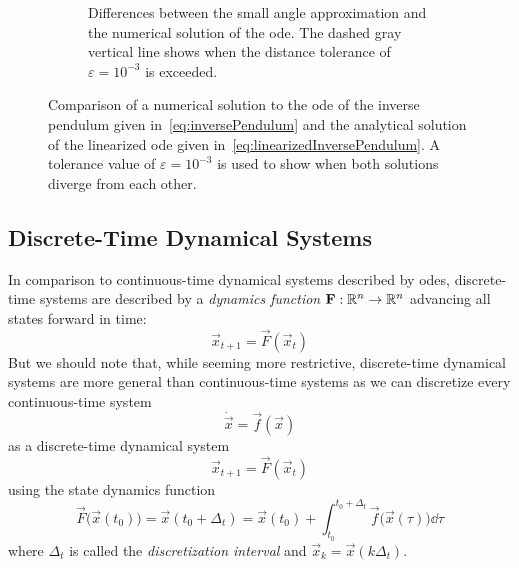 \begin{figure}
\begin{subfigure}[t]{0.5\linewidth}
				\caption{Differences between the small angle approximation and the numerical solution of the \ac{ode}. The dashed gray vertical line shows when the distance tolerance of \( \varepsilon = 10^{-3} \) is exceeded.}
			\end{subfigure}
			\caption{Comparison of a numerical solution to the \ac{ode} of the inverse pendulum given in~\eqref{eq:inversePendulum} and the analytical solution of the linearized \ac{ode} given in~\eqref{eq:linearizedInversePendulum}. A tolerance value of \( \varepsilon = 10^{-3} \) is used to show when both solutions diverge from each other.}
			\label{fig:inversePendulumApprox}
		\end{figure}

	\subsection{Discrete-Time Dynamical Systems}
		In comparison to continuous-time dynamical systems described by \acp{ode}, discrete-time systems are described by a \emph{dynamics function} \( \boldsymbol{\mathrm{F}} : \mathbb{R}^n \to \mathbb{R}^n \) advancing all states forward in time:
		\begin{equation*}
			\vec{x}_{t + 1} = \vec{F}(\vec{x}_t)
		\end{equation*}
		But we should note that, while seeming more restrictive, discrete-time dynamical systems are more general than continuous-time systems as we can discretize every continuous-time system
		\begin{equation*}
			\dot{\vec{x}} = \vec{f}(\vec{x})
		\end{equation*}
		as a discrete-time dynamical system
		\begin{equation*}
			\vec{x}_{t + 1} = \vec{F}(\vec{x}_t)
		\end{equation*}
		using the state dynamics function
		\begin{equation*}
			\vec{F}\big(\vec{x}(t_0)\big) = \vec{x}(t_0 + \Delta_t) = \vec{x}(t_0) + \int_{t_0}^{t_0 + \Delta_t} \! \vec{f}\big(\vec{x}(\tau)\big) \dd{\tau}
		\end{equation*}
		where \( \Delta_t \) is called the \emph{discretization interval} and \( \vec{x}_k = \vec{x}(k \Delta_t) \).

